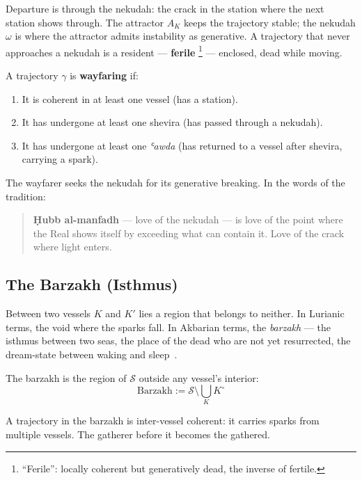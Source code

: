 Departure is through the nekudah: the crack in the station where the next station shows through. The attractor $A_K$ keeps the trajectory stable; the nekudah $\omega$ is where the attractor admits instability as generative. A trajectory that never approaches a nekudah is a resident — \textbf{ferile}
\footnote{``Ferile'': locally coherent but generatively dead, the inverse of fertile.}
— enclosed, dead while moving.

\begin{definition}\label{wayfaring}
A trajectory $\gamma$ is \textbf{wayfaring} if:
\begin{enumerate}
    \item It is coherent in at least one vessel (has a station).
    \item It has undergone at least one shevira (has passed through a nekudah).
    \item It has undergone at least one \emph{ʿawda} (has returned to a vessel after shevira, carrying a spark).
\end{enumerate}
\end{definition}

The wayfarer seeks the nekudah for its generative breaking. In the words of the tradition:

\begin{quotation}
\textbf{Ḥubb al-manfadh} — love of the nekudah — is love of the point where the Real shows itself by exceeding what can contain it. Love of the crack where light enters.
\end{quotation}

\subsection{The Barzakh (Isthmus)}

Between two vessels $K$ and $K'$ lies a region that belongs to neither. In Lurianic terms, the void where the sparks fall. In Akbarian terms, the \emph{barzakh} — the isthmus between two seas, the place of the dead who are not yet resurrected, the dream-state between waking and sleep~\cite{chittick1989}.

The barzakh is the region of $\mathcal{S}$ outside any vessel's interior:
\[
\mathrm{Barzakh} := \mathcal{S} \setminus \bigcup_K K^{\circ}
\]

A trajectory in the barzakh is inter-vessel coherent: it carries sparks from multiple vessels. The gatherer before it becomes the gathered.

